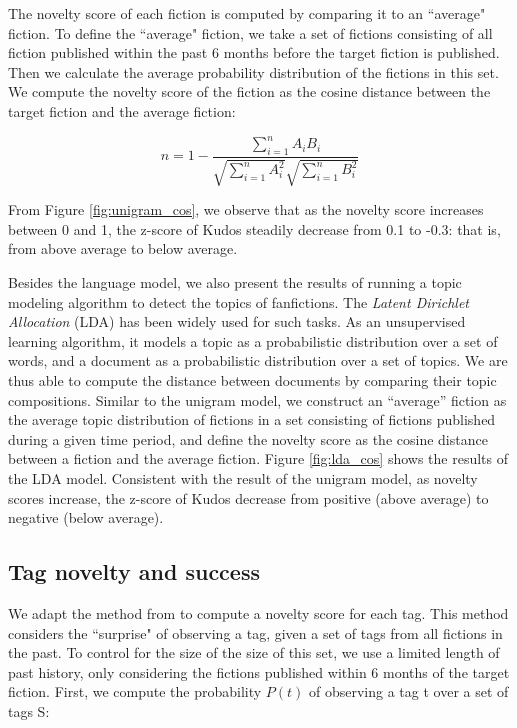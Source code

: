 \documentclass[a4paper]{article}
\begin{document}
The novelty score of each fiction is computed by comparing it to an ``average" fiction. To define the ``average" fiction, we take a set of fictions consisting of all fiction published within the past 6 months before the target fiction is published. Then we calculate the average probability distribution of the fictions in this set. We compute the novelty score of the fiction as the cosine distance between the target fiction and the average fiction:

\begin{equation}
n = 1-\frac{\sum_{i=1}^{n}{A_iB_i}}{\sqrt{\sum_{i=1}^{n}{A_i^2}}\sqrt{\sum_{i=1}^{n}{B_i^2}}}
\end{equation}

From Figure \ref{fig:unigram_cos}, we observe that as the novelty score increases between 0 and 1, the z-score of Kudos steadily decrease from 0.1 to -0.3: that is, from above average to below average. 

Besides the language model, we also present the results of running a topic modeling algorithm to detect the topics of fanfictions. 
The \emph{Latent Dirichlet Allocation} (LDA) \cite{blei2003latent} has been widely used for such tasks. As an unsupervised learning algorithm, it models a topic as a probabilistic distribution over a set of words, and a document as a probabilistic distribution over a set of topics. We are thus able to compute the distance between documents by comparing their topic compositions. Similar to the unigram model, we construct an ``average'' fiction as the average topic distribution of fictions in a set consisting of fictions published during a given time period, and define the novelty score as the cosine distance between a fiction and the average fiction. Figure \ref{fig:lda_cos} shows the results of the LDA model. Consistent with the result of the unigram model, as novelty scores increase, the z-score of Kudos decrease from positive (above average) to negative (below average).

\subsection*{Tag novelty and success}
We adapt the method from \cite{sreenivasan2013quantitative} to compute a novelty score for each tag. This method considers the ``surprise" of observing a tag, given a set of tags from all fictions in the past. To control for the size of the size of this set, we use a limited length of past history, only considering the fictions published within 6 months of the target fiction. First, we compute the probability $P(t)$ of observing a tag t over a set of tags S:
\end{document}
